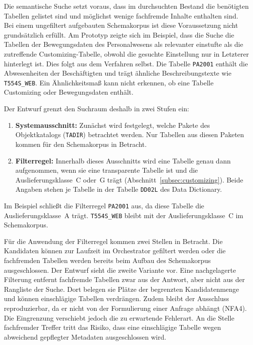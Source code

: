 Die semantische Suche setzt voraus, dass im durchsuchten Bestand die benötigten Tabellen gelistet sind und möglichst wenige fachfremde Inhalte enthalten sind. %
Bei einem ungefiltert aufgebauten Schemakorpus ist diese Voraussetzung nicht grundsätzlich erfüllt. Am Prototyp zeigte sich im Beispiel, dass die Suche die Tabellen der Bewegungsdaten des Personalwesens als relevanter einstufte als die zutreffende Customizing-Tabelle, obwohl die gesuchte Einstellung nur in Letzterer hinterlegt ist. %
Dies folgt aus dem Verfahren selbst. Die Tabelle \texttt{PA2001} enthält die Abwesenheiten der Beschäftigten und trägt ähnliche Beschreibungstexte wie \texttt{T554S\_WEB}. Ein Ähnlichkeitsmaß kann nicht erkennen, ob eine Tabelle Customizing oder Bewegungsdaten enthält.

Der Entwurf grenzt den Suchraum deshalb in zwei Stufen ein:
\begin{enumerate}
	\item \textbf{Systemausschnitt:} Zunächst wird festgelegt, welche Pakete des Objektkatalogs (\texttt{TADIR}) betrachtet werden. Nur Tabellen aus diesen Paketen kommen für den Schemakorpus in Betracht.
	\item \textbf{Filterregel:} Innerhalb dieses Ausschnitts wird eine Tabelle genau dann aufgenommen, wenn sie eine transparente Tabelle ist und die Auslieferungsklasse~C oder~G trägt (Abschnitt~\ref{subsec:customizing}). Beide Angaben stehen je Tabelle in der Tabelle \texttt{DD02L} des Data Dictionary.
\end{enumerate}
Im Beispiel schließt die Filterregel \texttt{PA2001} aus, da diese Tabelle die Auslieferungsklasse~A trägt. \texttt{T554S\_WEB} bleibt mit der Auslieferungsklasse~C im Schemakorpus.

Für die Anwendung der Filterregel kommen zwei Stellen in Betracht. Die Kandidaten können zur Laufzeit im Orchestrator gefiltert werden oder die fachfremden Tabellen werden bereits beim Aufbau des Schemakorpus ausgeschlossen. Der Entwurf sieht die zweite Variante vor. Eine nachgelagerte Filterung entfernt fachfremde Tabellen zwar aus der Antwort, aber nicht aus der Rangliste der Suche. Dort belegen sie Plätze der begrenzten Kandidatenmenge und können einschlägige Tabellen verdrängen. Zudem bleibt der Ausschluss reproduzierbar, da er nicht von der Formulierung einer Anfrage abhängt (NFA4). Die Eingrenzung verschiebt jedoch die zu erwartende Fehlerart. An die Stelle fachfremder Treffer tritt das Risiko, dass eine einschlägige Tabelle wegen abweichend gepflegter Metadaten ausgeschlossen wird.

